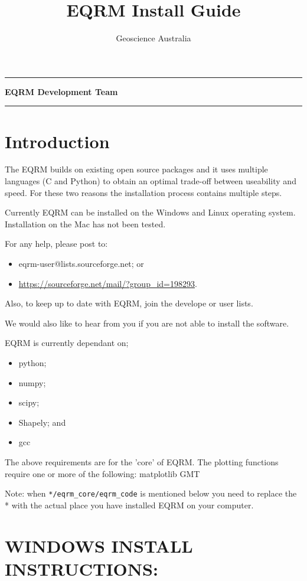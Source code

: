\documentclass[a4paper, 12pt]{article}
\title{EQRM Install Guide}
\author{Geoscience Australia}
\makeatletter
\def\maketitle{%
\null
\thispagestyle{empty}%
\hrule height 0.5pt \vskip 2.5cm
\begin{center}
\normalfont
{\Large \textbf\@title\par}%
\vskip 2.5cm \normalsize \textbf{EQRM Development Team} \vskip 2.5cm
{\normalsize \textbf \@author\par}%
\vskip 4.53cm
{\normalsize \textbf \@date\par}%
\vskip 3.5cm \hrule height 0.5pt
\end{center}%
\null \clearpage }
\makeatother
\begin{document}
\maketitle

\section{Introduction}

The EQRM builds on existing open source packages and it uses
multiple languages (C and Python) to obtain an optimal trade-off
between useability and speed. For these two reasons the installation
process contains multiple steps.

Currently EQRM can be installed on the Windows and Linux operating
system. Installation on the Mac has not been tested.

For any help, please post to:
\begin{itemize}
\item eqrm-user@lists.sourceforge.net; or
\item \url{https://sourceforge.net/mail/?group_id=198293}.
\end{itemize}
Also, to keep up to date with EQRM, join the develope or user lists.

We would also like to hear from you if you are not able to install
the software.

EQRM is currently dependant on;
\begin{itemize}
\item python;
\item numpy;
\item scipy;
\item Shapely; and
\item gcc
\end{itemize}

The above requirements are for the 'core' of EQRM. The plotting
functions require one or more of the following: matplotlib GMT

Note: when \texttt{*/eqrm\_core/eqrm\_code} is mentioned below you
need to replace the * with the actual place you have installed EQRM
on your computer.

\section{WINDOWS INSTALL INSTRUCTIONS:}
\end{document}
